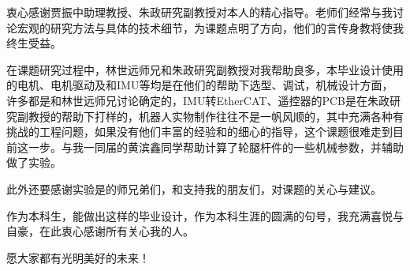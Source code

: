 

衷心感谢贾振中助理教授、朱政研究副教授对本人的精心指导。老师们经常与我讨论宏观的研究方法与具体的技术细节，为课题点明了方向，他们的言传身教将使我终生受益。

在课题研究过程中，林世远师兄和朱政研究副教授对我帮助良多，本毕业设计使用的电机、电机驱动及和IMU等均是在他们的帮助下选型、调试，机械设计方面，许多都是和林世远师兄讨论确定的，IMU转EtherCAT、遥控器的PCB是在朱政研究副教授的帮助下打样的，机器人实物制作往往不是一帆风顺的，其中充满各种有挑战的工程问题，如果没有他们丰富的经验和的细心的指导，这个课题很难走到目前这一步。与我一同届的黄滨鑫同学帮助计算了轮腿杆件的一些机械参数，并辅助做了实验。

此外还要感谢实验是的师兄弟们，和支持我的朋友们，对课题的关心与建议。

作为本科生，能做出这样的毕业设计，作为本科生涯的圆满的句号，我充满喜悦与自豪，在此衷心感谢所有关心我的人。

愿大家都有光明美好的未来！
